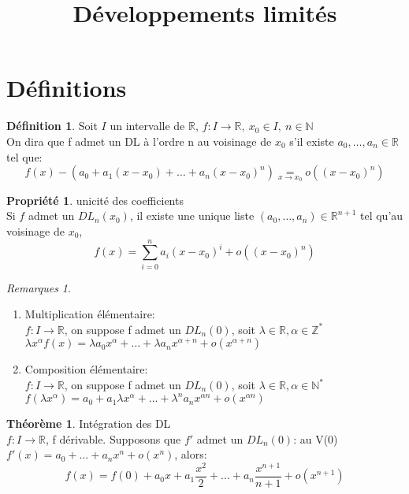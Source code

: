 \documentclass[fleqn]{article}
\title{D\'eveloppements limit\'es}
\date{}
\theoremstyle{definition} \newtheorem*{defi}{D\'efinition}
\theoremstyle{definition} \newtheorem*{theo}{Th\'eor\`eme}
\theoremstyle{definition} \newtheorem*{prop}{Propri\'et\'e}
\theoremstyle{definition} \newtheorem*{coro}{Corollaire}
\theoremstyle{remark} \newtheorem*{rqs}{Remarques}
\begin{document}
\maketitle

\section{D\'efinitions}
\begin{defi}
	Soit $I$ un intervalle de $\mathbb{R}$, $f:I \rightarrow \mathbb{R},\ x_0 \in I,\ n \in \mathbb{N}$ \\
	On dira que f admet un DL \`a l'ordre n au voisinage de $x_0$ s'il existe $a_0, \hdots, a_n \in \mathbb{R}$ tel que: \\
	\[f(x) - (a_0 + a_1(x-x_0) + \hdots + a_n(x-x_0)^n) \underset{x \rightarrow x_0}{=} o((x-x_0)^n)\]
\end{defi}

\begin{prop} unicit\'e des coefficients \\
	Si $f$ admet un $DL_n(x_0)$, il existe une unique liste $(a_0, \hdots, a_n) \in \mathbb{R}^{n+1}$ tel qu'au voisinage de $x_0$,
	\[f(x) = \sum_{i=0}^{n} a_i(x-x_0)^i  + o((x-x_0)^n)\]
\end{prop}

\begin{rqs}
	$\ $
	\begin{enumerate}
		\item Multiplication \'el\'ementaire: \\
		$f: I \rightarrow \mathbb{R}$, on suppose f admet un $DL_n(0)$, soit $\lambda \in \mathbb{R}, \alpha \in \mathbb{Z}^{*}$ \\
		$\lambda x^{\alpha} f(x) = \lambda a_0 x^{\alpha} + \hdots + \lambda a_n x^{\alpha+n} + o(x^{\alpha + n})$
		\item Composition \'el\'ementaire: \\
		$f: I \rightarrow \mathbb{R}$, on suppose f admet un $DL_n(0)$, soit $\lambda \in \mathbb{R}, \alpha \in \mathbb{N}^*$ \\
		$f(\lambda x^{\alpha}) = a_0 + a_1 \lambda x^{\alpha} + \hdots + \lambda ^n a_n x^{\alpha n} + o(x^{\alpha n})$
	\end{enumerate}
\end{rqs}

\begin{theo} Int\'egration des DL \\
	$f: I \rightarrow \mathbb{R}$, f d\'erivable. Supposons que $f'$ admet un $DL_n(0)$: au V(0)\\
	$f'(x) = a_0 + \hdots + a_n x^{n} + o(x^n)$, alors:
	\[f(x) = f(0) + a_0 x + a_1 \frac{x^2}{2} + \hdots + a_n \frac{x^{n+1}}{n+1} + o(x^{n+1})\]
\end{theo}
\end{document}
